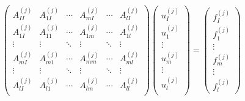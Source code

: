 \begin{equation}
\begin{pmatrix}
A_{II}^{(j)} & A_{1I}^{(j)} & \cdots & A_{mI}^{(j)} & \cdots & A_{l I}^{(j)} \\
A_{1 I}^{(j)} & A_{11}^{(j)} & \cdots & A_{1m}^{(j)} & \cdots & A_{1l}^{(j)} \\
\vdots & \vdots & \ddots & \vdots & \ddots & \vdots \\
A_{mI}^{(j)} & A_{m1}^{(j)} & \cdots & A_{mm}^{(j)} & \cdots & A_{ml}^{(j)} \\
\vdots & \vdots & \ddots & \vdots & \ddots & \vdots \\
A_{lI}^{(j)} & A_{l1}^{(j)} & \cdots & A_{lm}^{(j)} & \cdots & A_{ll}^{(j)}\\
\end{pmatrix} \begin{pmatrix}
u_{I}^{(j)} \\ u_{1}^{(j)} \\ \vdots \\ u_{m}^{(j)} \\ \vdots \\ u_{l}^{(j)}\\
\end{pmatrix} = \begin{pmatrix}
f_{I}^{(j)} \\ f_{1}^{(j)} \\ \vdots \\ f_{m}^{(j)} \\ \vdots \\ f_{l}^{(j)}
\end{pmatrix}
\end{equation}

